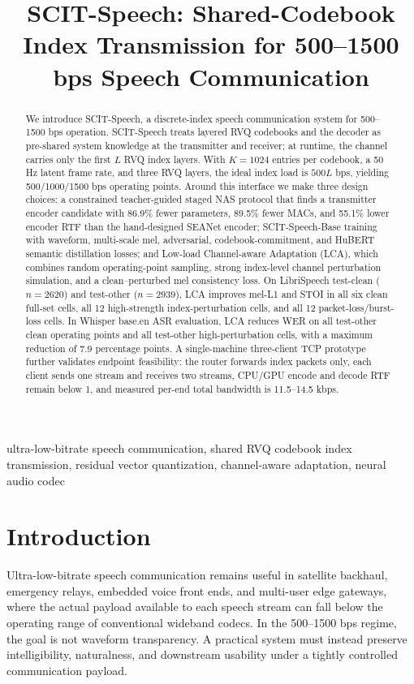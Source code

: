 ﻿\documentclass[conference]{IEEEtran}
\title{SCIT-Speech: Shared-Codebook Index Transmission for 500--1500 bps Speech Communication}
\author{
\IEEEauthorblockN{Anonymous Authors}
\IEEEauthorblockA{Anonymous Institution\\
Email: anonymous@example.com}
}
\newcommand{\method}{SCIT-Speech}
\newcommand{\base}{SCIT-Speech-Base}
\begin{document}
\maketitle
\begin{abstract}
We introduce \method, a discrete-index speech communication system for 500--1500 bps operation. \method{} treats layered RVQ codebooks and the decoder as pre-shared system knowledge at the transmitter and receiver; at runtime, the channel carries only the first \(L\) RVQ index layers. With \(K=1024\) entries per codebook, a 50 Hz latent frame rate, and three RVQ layers, the ideal index load is \(500L\) bps, yielding 500/1000/1500 bps operating points. Around this interface we make three design choices: a constrained teacher-guided staged NAS protocol that finds a transmitter encoder candidate with 86.9\% fewer parameters, 89.5\% fewer MACs, and 55.1\% lower encoder RTF than the hand-designed SEANet encoder; \base{} training with waveform, multi-scale mel, adversarial, codebook-commitment, and HuBERT semantic distillation losses; and Low-load Channel-aware Adaptation (LCA), which combines random operating-point sampling, strong index-level channel perturbation simulation, and a clean--perturbed mel consistency loss. On LibriSpeech test-clean (\(n=2620\)) and test-other (\(n=2939\)), LCA improves mel-L1 and STOI in all six clean full-set cells, all 12 high-strength index-perturbation cells, and all 12 packet-loss/burst-loss cells. In Whisper base.en ASR evaluation, LCA reduces WER on all test-other clean operating points and all test-other high-perturbation cells, with a maximum reduction of 7.9 percentage points. A single-machine three-client TCP prototype further validates endpoint feasibility: the router forwards index packets only, each client sends one stream and receives two streams, CPU/GPU encode and decode RTF remain below 1, and measured per-end total bandwidth is 11.5--14.5 kbps.
\end{abstract}

\begin{IEEEkeywords}
ultra-low-bitrate speech communication, shared RVQ codebook index transmission, residual vector quantization, channel-aware adaptation, neural audio codec
\end{IEEEkeywords}

\section{Introduction}

Ultra-low-bitrate speech communication remains useful in satellite backhaul, emergency relays, embedded voice front ends, and multi-user edge gateways, where the actual payload available to each speech stream can fall below the operating range of conventional wideband codecs. In the 500--1500 bps regime, the goal is not waveform transparency. A practical system must instead preserve intelligibility, naturalness, and downstream usability under a tightly controlled communication payload.
\end{document}
